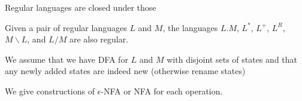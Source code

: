\documentclass[handout]{beamer}
\begin{document}
\begin{frame}{Regular languages are closed under those}

    \begin{theorem}
        Given a pair of regular languages $L$ and $M$, the languages $L.M$, $L^*$, $L^+$, $L^R$, $M\backslash L$, and $L/M$ are also regular.
    \end{theorem}

    We assume that we have DFA for $L$ and $M$ with disjoint sets of states and that any newly added states are indeed new (otherwise rename states)

    We give constructions of $\epsilon$-NFA or NFA for each operation.

\end{frame}
\end{document}
